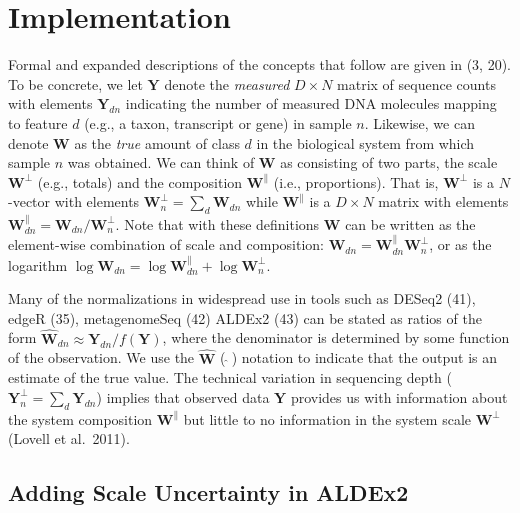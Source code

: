 \documentclass[
]{article}
\begin{document}
\section{Implementation}\label{implementation}

Formal and expanded descriptions of the concepts that follow are given
in (3, 20). To be concrete, we let \(\mathbf{Y}\) denote the
\emph{measured} \(D \times N\) matrix of sequence counts with elements
\(\mathbf{Y}_{dn}\) indicating the number of measured DNA molecules
mapping to feature \(d\) (e.g., a taxon, transcript or gene) in sample
\(n\). Likewise, we can denote \(\mathbf{W}\) as the \emph{true} amount
of class \(d\) in the biological system from which sample \(n\) was
obtained. We can think of \(\mathbf{W}\) as consisting of two parts, the
scale \(\mathbf{W}^{\perp}\) (e.g., totals) and the composition
\(\mathbf{W}^{\parallel}\) (i.e., proportions). That is,
\(\mathbf{W}^{\perp}\) is a \(N\)-vector with elements
\(\mathbf{W}^{\perp}_{n}=\sum_{d}\mathbf{W}_{dn}\) while
\(\mathbf{W}^{\parallel}\) is a \(D \times N\) matrix with elements
\(\mathbf{W}^{\parallel}_{dn}=\mathbf{W}_{dn}/\mathbf{W}^{\perp}_{n}\).
Note that with these definitions \(\mathbf{W}\) can be written as the
element-wise combination of scale and composition:
\(\mathbf{W}_{dn}=\mathbf{W}^{\parallel}_{dn}\mathbf{W}^{\perp}_{n}\),
or as the logarithm
\(\log \mathbf{W}_{dn}= \log \mathbf{W}^{\parallel}_{dn} + \log
\mathbf{W}^{\perp}_{n}\).

Many of the normalizations in widespread use in tools such as DESeq2
(41), edgeR (35), metagenomeSeq (42) ALDEx2 (43) can be stated as ratios
of the form \(\hat{{\mathbf{W}}}_{dn}
\approx \mathbf{Y}_{dn}/f(\mathbf{Y})\), where the denominator is
determined by some function of the observation. We use the
\(\hat{{\mathbf{W}}}\) (\(\ \hat{}\
\)) notation to indicate that the output is an estimate of the true
value. The technical variation in sequencing depth
(\(\mathbf{Y}^{\perp}_{n}=\sum_{d}\mathbf{Y}_{dn}\)) implies that
observed data \(\mathbf{Y}\) provides us with information about the
system composition \(\mathbf{W}^{\parallel}\) but little to no
information in the system scale \(\mathbf{W}^{\perp}\) (Lovell et
al.~2011).

\subsection{Adding Scale Uncertainty in
ALDEx2}\label{adding-scale-uncertainty-in-aldex2}
\end{document}

